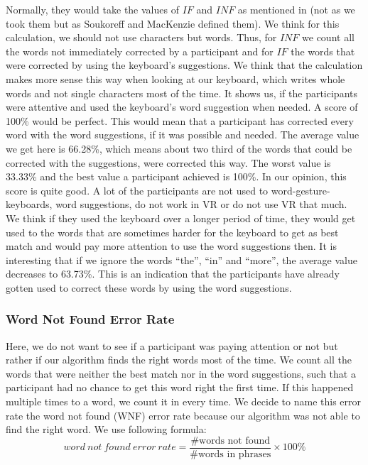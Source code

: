 Normally, they would take the values of $IF$ and $INF$ as mentioned in  (not as we took them but as Soukoreff and MacKenzie \cite{10.1145/642611.642632} defined them). We think for this calculation, we should not use characters but words. Thus, for $INF$ we count all the words not immediately corrected by a participant and for $IF$ the words that were corrected by using the keyboard's suggestions. We think that the calculation makes more sense this way when looking at our keyboard, which writes whole words and not single characters most of the time. It shows us, if the participants were attentive and used the keyboard's word suggestion when needed. A score of 100\% would be perfect. This would mean that a participant has corrected every word with the word suggestions, if it was possible and needed. The average value we get here is 66.28\%, which means about two third of the words that could be corrected with the suggestions, were corrected this way. The worst value is 33.33\% and the best value a participant achieved is 100\%. In our opinion, this score is quite good. A lot of the participants are not used to word-gesture-keyboards, word suggestions, do not work in VR or do not use VR that much. We think if they used the keyboard over a longer period of time, they would get used to the words that are sometimes harder for the keyboard to get as best match and would pay more attention to use the word suggestions then. It is interesting that if we ignore the words ``the'', ``in'' and ``more'', the average value decreases to 63.73\%. This is an indication that the participants have already gotten used to correct these words by using the word suggestions.

\subsubsection{Word Not Found Error Rate}
Here, we do not want to see if a participant was paying attention or not but rather if our algorithm finds the right words most of the time. We count all the words that were neither the best match nor in the word suggestions, such that a participant had no chance to get this word right the first time. If this happened multiple times to a word, we count it in every time. We decide to name this error rate the word not found (WNF) error rate because our algorithm was not able to find the right word. We use following formula:
\begin{equation}
    word\ not\ found\ error\ rate = \frac{\text{\# words not found}}{\text{\# words in phrases}} \times 100\%
    \label{eq:WNF_er}
\end{equation}

